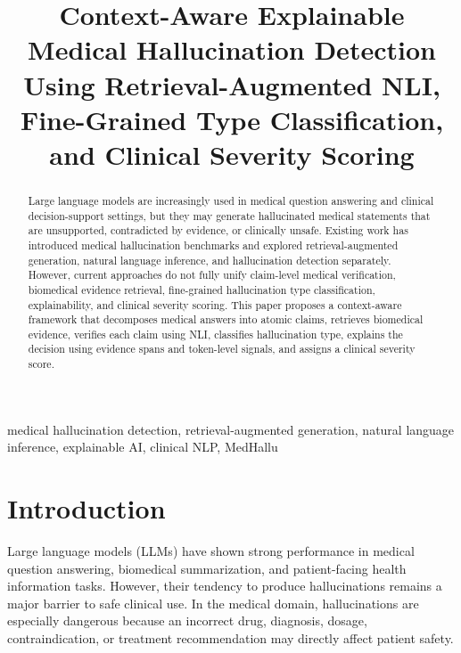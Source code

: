 \documentclass[conference]{IEEEtran}
\begin{document}
\title{Context-Aware Explainable Medical Hallucination Detection Using Retrieval-Augmented NLI, Fine-Grained Type Classification, and Clinical Severity Scoring}

\author{
}

\maketitle

\begin{abstract}
Large language models are increasingly used in medical question answering and clinical decision-support settings, but they may generate hallucinated medical statements that are unsupported, contradicted by evidence, or clinically unsafe. Existing work has introduced medical hallucination benchmarks and explored retrieval-augmented generation, natural language inference, and hallucination detection separately. However, current approaches do not fully unify claim-level medical verification, biomedical evidence retrieval, fine-grained hallucination type classification, explainability, and clinical severity scoring. This paper proposes a context-aware framework that decomposes medical answers into atomic claims, retrieves biomedical evidence, verifies each claim using NLI, classifies hallucination type, explains the decision using evidence spans and token-level signals, and assigns a clinical severity score.
\end{abstract}

\begin{IEEEkeywords}
medical hallucination detection, retrieval-augmented generation, natural language inference, explainable AI, clinical NLP, MedHallu
\end{IEEEkeywords}

\section{Introduction}
Large language models (LLMs) have shown strong performance in medical question answering, biomedical summarization, and patient-facing health information tasks. However, their tendency to produce hallucinations remains a major barrier to safe clinical use. In the medical domain, hallucinations are especially dangerous because an incorrect drug, diagnosis, dosage, contraindication, or treatment recommendation may directly affect patient safety.
\end{document}
